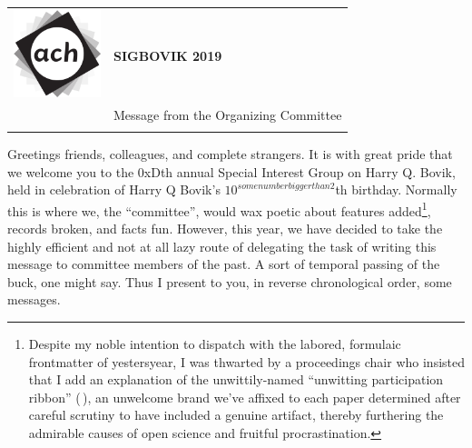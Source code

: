 \documentclass[12pt]{article}
\begin{document}
{\sffamily
\begin{tabular}{ll}
\multirow{3}{*}{\includegraphics[width=1in]{ach.png}}\\
& \textbf{\Huge{SIGBOVIK 2019}} \\ &\\
& \LARGE{Message from the Organizing Committee} \\
&\\
\hline
\end{tabular}}
\vspace{2em}
\thispagestyle{empty}

Greetings friends, colleagues, and complete strangers. It is with great pride that we welcome you to the 0xDth annual Special Interest Group on Harry Q. Bovik, held in celebration of Harry Q Bovik's $10^{somenumberbiggerthan2}$th birthday. Normally this is where we, the ``committee'', would wax poetic about  features added\footnote{Despite my noble intention to dispatch with the labored, formulaic frontmatter of yestersyear, I was thwarted by a proceedings chair who insisted that I add an explanation of the unwittily-named ``unwitting participation ribbon'' (\,), an unwelcome brand we've affixed to each paper determined after careful scrutiny to have included a genuine artifact, thereby furthering the admirable causes of open science and fruitful procrastination.}, records broken, and facts fun. However, this year, we have decided to take the highly efficient and not at all lazy route of delegating the task of writing this message to committee members of the past. A sort of temporal passing of the buck, one might say. Thus I present to you, in reverse chronological order, some messages.
\end{document}
